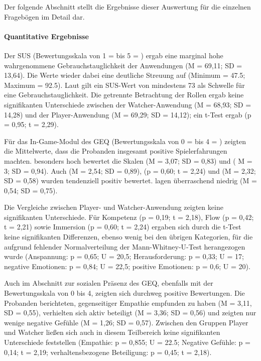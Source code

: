 Der folgende Abschnitt stellt die Ergebnisse dieser Auswertung für die einzelnen Fragebögen im Detail dar.

\paragraph{Quantitative Ergebnisse}

Der \ac{SUS} (Bewertungsskala von 1 =  bis 5 = ) ergab eine marginal hohe wahrgenommene Gebrauchstauglichkeit der Anwendungen (M = 69,11; SD = 13,64). Die Werte wieder dabei eine deutliche Streuung auf (Minimum = 47.5; Maximum = 92.5). Laut \citep[S. 36]{brooke_sus_2013} gilt ein \ac{SUS}-Wert von mindestens 73 als Schwelle für eine  Gebrauchstauglichkeit. Die getrennte Betrachtung der Rollen ergab keine signifikanten Unterschiede zwischen der Watcher-Anwendung (M = 68,93; SD = 14,28) und der Player-Anwendung (M = 69,29; SD = 14,12); ein t-Test ergab  (p = 0,95; t = 2,29).

Für das In-Game-Modul des \ac{GEQ} (Bewertungsskala von 0 =  bis 4 = ) zeigten die Mittelwerte, dass die Probanden insgesamt positive Spielerfahrungen machten. besonders hoch bewertet die Skalen  (M = 3,07; SD = 0,83) und  ( M = 3; SD = 0,94). Auch  (M = 2,54; SD = 0,89),  (p = 0,60; t = 2,24) und  (M = 2,32; SD = 0,58) wurden tendenziell positiv bewertet.  lagen überraschend niedrig (M = 0,54; SD = 0,75).

Die Vergleiche zwischen Player- und Watcher-Anwendung zeigten keine signifikanten Unterschiede. Für Kompetenz (p = 0,19; t = 2,18), Flow (p = 0,42; t = 2,21) sowie Immersion (p = 0,60; t = 2,24) ergaben sich durch die t-Test keine signifikanten Differenzen, ebenso wenig bei den übrigen Kategorien, für die aufgrund fehlender Normalverteilung der Mann-Whitney-U-Test herangezogen wurde (Anspannung: p = 0,65; U = 20,5; Herausforderung: p = 0,33; U = 17; negative Emotionen: p = 0,84; U = 22,5; positive Emotionen: p = 0,6; U = 20).

Auch im Abschnitt zur sozialen Präsenz des \ac{GEQ}, ebenfalls mit der Bewertungsskala von 0 bis 4, zeigten sich durchweg positive Bewertungen. Die Probanden berichteten, gegenseitiger Empathie empfunden zu haben (M = 3,11, SD = 0,55), verhielten sich aktiv beteiligt (M = 3,36; SD = 0,56) und zeigten nur wenige negative Gefühle (M = 1,26; SD = 0,57). Zwischen den Gruppen Player und Watcher ließen sich auch in diesem Teilbereich keine signifikanten Unterschiede feststellen (Empathie: p = 0,855; U = 22.5; Negative Gefühle: p = 0,14; t = 2,19; verhaltensbezogene Beteiligung: p = 0,45; t = 2,18).

